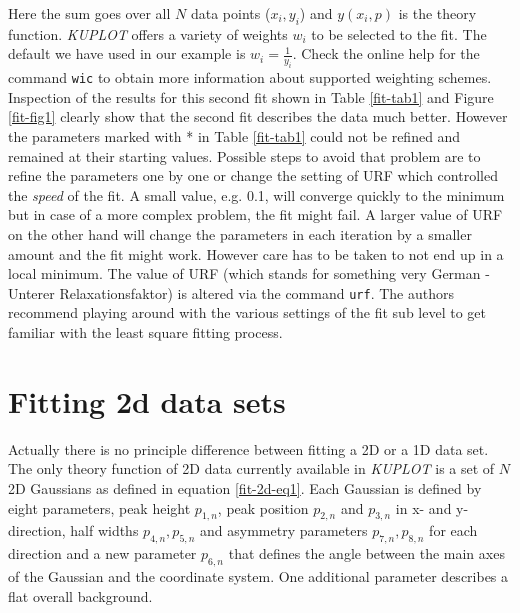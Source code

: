 Here the sum goes over all $N$ data points ($x_{i},y_{i}$) and
$y(x_{i},p)$ is the theory function.  {\it KUPLOT} offers a variety
of weights $w_{i}$ to be selected to the fit.  The default we have
used in our example is $w_{i} = \frac{1}{y_{i}}$.  Check the online
help for the command {\tt wic} to obtain more information about
supported weighting schemes.  Inspection of the results for this
second fit shown in Table \ref{fit-tab1} and Figure \ref{fit-fig1}
clearly show that the second fit describes the data much better.
However the parameters marked with * in Table \ref{fit-tab1} could
not be refined and remained at their starting values.  Possible
steps to avoid that problem are to refine the parameters one by one
or change the setting of URF which controlled the {\it speed} of the
fit. A small value, e.g.  0.1, will converge quickly to the minimum
but in case of a more complex problem, the fit might fail.  A larger
value of URF on the other hand will change the parameters in each
iteration by a smaller amount and the fit might work.  However care
has to be taken to not end up in a local minimum.  The value of URF
(which stands for something very German - Unterer Relaxationsfaktor)
is altered via the command {\tt urf}.  The authors recommend playing
around with the various settings of the fit sub level to get familiar
with the least square fitting process.


\section{Fitting 2d data sets \label{fit-2d}}

Actually there is no principle difference between fitting a 2D or a 1D data
set.  The only theory function of 2D data currently available in {\it
KUPLOT} is a set of $N$ 2D Gaussians as defined in equation \ref{fit-2d-eq1}.
Each Gaussian is defined by eight parameters, peak height $p_{1,n}$, peak
position $p_{2,n}$ and $p_{3,n}$ in x- and y-direction, half widths
$p_{4,n}, p_{5,n}$ and asymmetry parameters $p_{7,n}, p_{8,n}$ for each
direction and a new parameter $p_{6,n}$ that defines the angle between the
main axes of the Gaussian and the coordinate system.  One additional
parameter describes a flat overall background.



